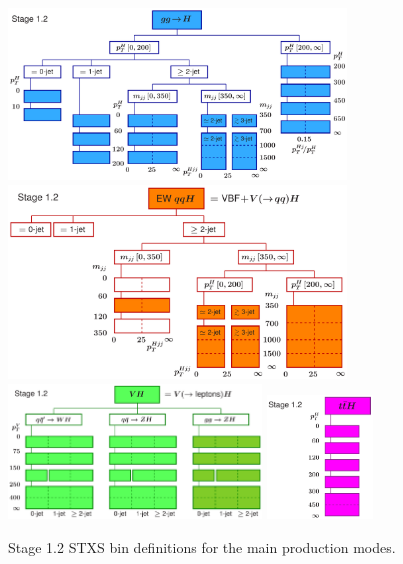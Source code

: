 \begin{figure}[tbp]
  \centering
  \includegraphics[width=0.8\textwidth]{figures/theory_chapter/simplifiedXS_ggF_1_2} \\[3mm]
  \includegraphics[width=0.8\textwidth]{figures/theory_chapter/simplifiedXS_VBF_1_2} \\[3mm]
  \includegraphics[width=0.6\textwidth]{figures/theory_chapter/simplifiedXS_VH_1_2}
  \includegraphics[width=0.25\textwidth]{figures/theory_chapter/simplifiedXS_ttH_1_2}
  \caption{Stage 1.2 STXS bin definitions for the main production modes.}
  \label{fig:STXS_scheme}
\end{figure}


